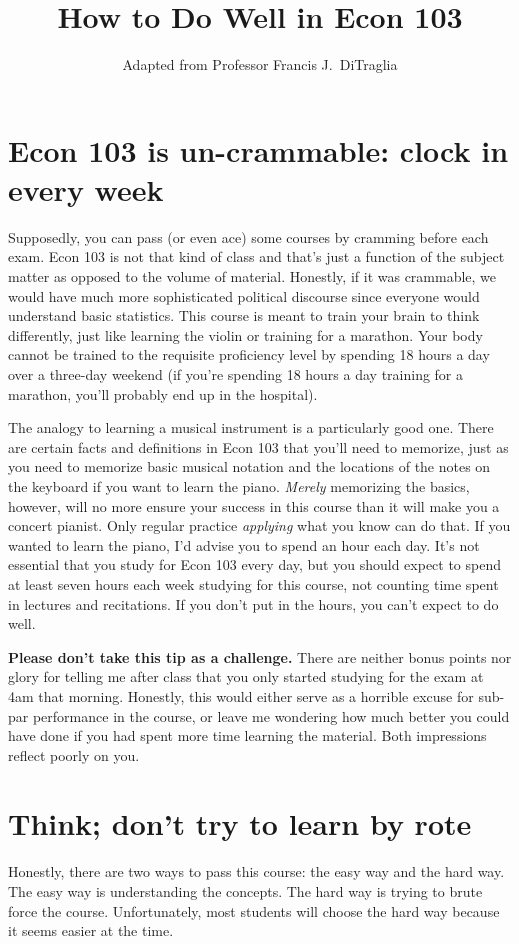 \documentclass[12pt,letterpaper]{article}
\title{How to Do Well in Econ 103}
\author{Adapted from Professor Francis J.\ DiTraglia}
\date{}
\begin{document}
\maketitle

\section{Econ 103 is un-crammable: clock in every week}
Supposedly, you can pass (or even ace) some courses by cramming before each exam. Econ 103 is not that kind of class and that's just a function of the subject matter as opposed to the volume of material. Honestly, if it was crammable, we would have much more sophisticated political discourse since everyone would understand basic statistics. This course is meant to train your brain to think differently, just like learning the violin or training for a marathon. Your body cannot be trained to the requisite proficiency level by spending 18 hours a day over a three-day weekend (if you're spending 18 hours a day training for a marathon, you'll probably end up in the hospital).

The analogy to learning a musical instrument is a particularly good one. There are certain facts and definitions in Econ 103 that you'll need to memorize, just as you need to memorize basic musical notation and the locations of the notes on the keyboard if you want to learn the piano. \emph{Merely} memorizing the basics, however, will no more ensure your success in this course than it will make you a concert pianist. Only regular practice \emph{applying} what you know can do that. If you wanted to learn the piano, I'd advise you to spend an hour each day. It's not essential that you study for Econ 103 every day, but you should expect to spend at least seven hours each week studying for this course, not counting time spent in lectures and recitations. If you don't put in the hours, you can't expect to do well.

\textbf{Please don't take this tip as a challenge.} There are neither bonus points nor glory for telling me after class that you only started studying for the exam at 4am that morning. Honestly, this would either serve as a horrible excuse for sub-par performance in the course, or leave me wondering how much better you could have done if you had spent more time learning the material. Both impressions reflect poorly on you. 

\section{Think; don't try to learn by rote}
Honestly, there are two ways to pass this course: the easy way and the hard way. The easy way is understanding the concepts. The hard way is trying to brute force the course. Unfortunately, most students will choose the hard way because it seems easier at the time. 
\end{document}
